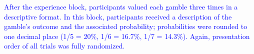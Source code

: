 \documentclass[a4paper, man, natbib, floatsintext]{apa6} %
\begin{document}
\textcolor{blue}{After the experience block, participants valued each gamble three times in a descriptive format. In this block, participants received a description of the gamble's outcome and the associated probability; probabilities were rounded to one decimal place (1/5 = 20\%, 1/6 = 16.7\%, 1/7 = 14.3\%). Again, presentation order of all trials was fully randomized.}
\end{document}
